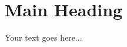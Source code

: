 \documentclass{article}
\begin{document}
\section{Main Heading}

Your text goes here...
\end{document}
